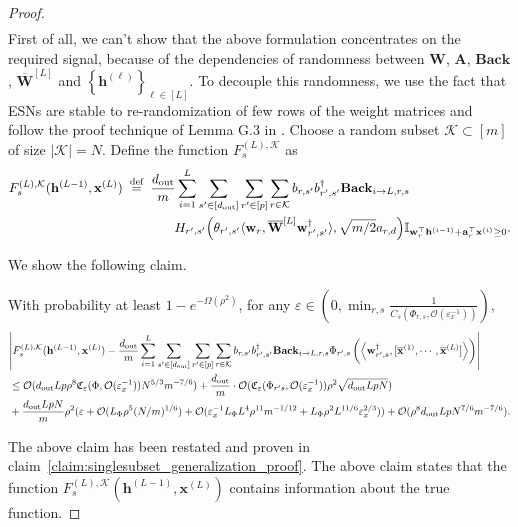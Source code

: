 \begin{proof}
\begin{align}
	\end{align}
	\endgroup
	First of all, we can't show that the above formulation concentrates on the required signal, because of the dependencies of randomness between $\mathbf{W}$, $\mathbf{A}$, $\mathbf{Back}$, $\mathbf{\overline{\mathbf{W}}}^{[L]}$ and $\left\{\mathbf{h}^{(\ell)}\right\}_{\ell \in [L]}$.  To decouple this randomness, we use the fact that ESNs are stable to re-randomization of few rows of the weight matrices and follow the proof technique of Lemma G.3 in \cite{allen2019can}. Choose a random subset $\mathcal{K} \subset[m]$ of size $|\mathcal{K}|=N$. Define the function $F^{(L), \mathcal{K}}_s$ as
	\begin{align*}
		F_{s}^{(L), \mathcal{K}}(\mathbf{h}^{(L-1)}, \mathbf{x}^{(L)}) &\stackrel{\text { def }}{=} \frac{d_{\mathrm{out}} }{m} \sum_{i=1}^{L}  \sum_{s' \in [d_{\mathrm{out}} ]} \sum_{r' \in [p]} \sum_{r \in \mathcal{K}}  b_{r, s'} b_{r', s'}^{\dagger} \mathbf{Back}_{i \to L, r, s} \nonumber\\& \quad \quad \quad \quad H_{r', s'}\Big(\theta_{r', s'} \langle \mathbf{w}_{r}, \overline{\mathbf{W}}^{[L]} \mathbf{w}_{r', s'}^{\dagger}\rangle , \sqrt{m/2} a_{r, d}\Big) \mathbb{I}_{\mathbf{w}_r^{\top} \mathbf{h}^{(i-1)} + \mathbf{a}_r^{\top} \mathbf{x}^{(i)} \ge 0}.  
	\end{align*}
	
	We show the following claim.
	\begin{claim}\label{claim:singlesubset_generalization}
		With probability at least $1-e^{-\Omega(\rho^2)}$, for any $\varepsilon \in (0, \min_{r, s} \frac{1}{C_s(\Phi_{r, s}, \mathcal{O}(\varepsilon_x^{-1}) ) })$,
		\begin{align*}      &\abs{F^{(L), \mathcal{K}}_s(\mathbf{h}^{(L-1)}, \mathbf{x}^{(L)}) - \frac{d_{\mathrm{out}} }{m} \sum_{i=1}^{L}  \sum_{s' \in [d_{\mathrm{out}} ]} \sum_{r' \in [p]} \sum_{r \in \mathcal{K}}  b_{r, s'} b_{r', s'}^{\dagger} \mathbf{Back}_{i \to L, r, s} \Phi_{r', s} \left(\left\langle \mathbf{w}_{r', s}^{\dagger}, [\overline{\mathbf{x}}^{(1)}, \cdots, \overline{\mathbf{x}}^{(L)}]\right\rangle\right)} \\&\le  \mathcal{O}(d_{\mathrm{out}} Lp\rho^8  \mathfrak{C}_{\varepsilon}(\Phi, \mathcal{O}(\varepsilon_x^{-1})) N^{5/3} m^{-7/6}) + \frac{d_{\mathrm{out}} }{m} \cdot \mathcal{O}(\mathfrak{C}_{\varepsilon}(\Phi_{r' s}, \mathcal{O}(\varepsilon_x^{-1})) \rho^2 \sqrt{d_{\mathrm{out}} LpN}) \\& + \frac{d_{\mathrm{out}} LpN}{m} \rho^2 (\varepsilon + \mathcal{O}( L_{\Phi}\rho^5 (N/m)^{1/6}) + \mathcal{O}(\varepsilon_x^{-1} L_{\Phi} L^4 \rho^{11} m^{-1/12} +  L_{\Phi} \rho^2 L^{11/6} \varepsilon_x^{2/3})) + \mathcal{O}(\rho^8d_{\mathrm{out}} Lp N^{7/6} m^{-7/6}) .
		\end{align*}
	\end{claim}
	The above claim has been restated and proven in claim~\ref{claim:singlesubset_generalization_proof}. The above claim states that the function $F^{(L), \mathcal{K}}_s(\mathbf{h}^{(L-1)}, \mathbf{x}^{(L)})$ contains information about the true function.
	

\end{proof}
